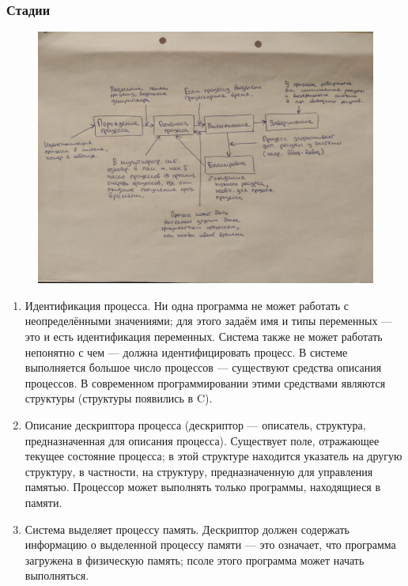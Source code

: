\subsubsection{Стадии}

\begin{figure}[H]
	\centering
	\includegraphics[width=\textwidth]{img/tables/01.jpg}
\end{figure}

\begin{enumerate}
    \item Идентификация процесса. Ни одна программа не может работать с неопределёнными значениями; для этого задаём имя и типы переменных --- это и есть идентификация переменных. Система также не может работать непонятно с чем --- должна идентифицировать процесс. В системе выполняется большое число процессов --- существуют средства описания процессов. В современном программировании этими средствами являются структуры (структуры появились в C).
    \item Описание дескриптора процесса (дескриптор --- описатель, структура, предназначенная для описания процесса). Существует поле, отражающее текущее состояние процесса; в этой структуре находится указатель на другую структуру, в частности, на структуру, предназначенную для управления памятью. Процессор может выполнять только программы, находящиеся в памяти.
    \item Система выделяет процессу память. Дескриптор должен содержать информацию о выделенной процессу памяти --- это означает, что программа загружена в физическую память; псоле этого программа может начать выполняться.
\end{enumerate}

